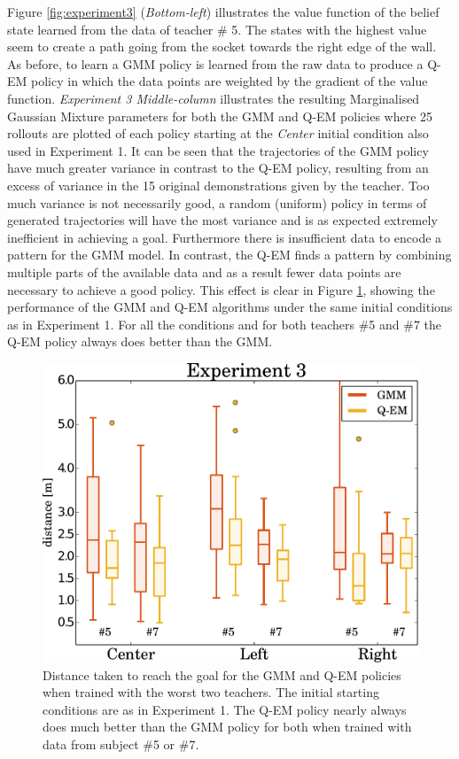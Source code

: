 \documentclass[final,5p,times,twocolumn]{elsarticle}
\begin{document}
Figure \ref{fig:experiment3} (\textit{Bottom-left}) illustrates the value function of the belief state learned from the data of teacher \# 5.
The states with the highest value seem to create a path going from the socket towards the right edge of the wall. 
As before, to learn a GMM policy is learned from the raw data to produce a Q-EM policy in which the data points are weighted by 
the gradient of the value function. \textit{Experiment 3 Middle-column} illustrates the 
resulting Marginalised Gaussian Mixture parameters for both the GMM and Q-EM policies where 25 rollouts are plotted of each policy starting at 
the \textit{Center} initial condition also used in Experiment 1. It can be seen that the trajectories of the GMM 
policy have much greater variance in contrast to the Q-EM policy, resulting from an excess of variance in the 15 original demonstrations
given by the teacher. Too much variance is not necessarily good, a random (uniform) policy in terms of generated trajectories
will have the most variance and is as expected extremely inefficient in achieving a goal. Furthermore there is insufficient data to encode a pattern for the GMM model. In contrast, the Q-EM finds a 
pattern by combining multiple parts of the available data and as a result fewer data points are necessary to achieve a good policy. 
This effect is clear in Figure \ref{fig:experiment3_stats}, showing the performance of the GMM and Q-EM algorithms 
under the same initial conditions as in Experiment 1. For all the conditions and for both teachers \#5 and \#7 the Q-EM policy 
always does better than the GMM.

\begin{figure}
 \centering
 \includegraphics[width=\linewidth]{./Figure/experiment3_stats.pdf}
 \caption{Distance taken to reach the goal for the GMM and Q-EM policies when trained with the 
 worst two teachers. The initial starting conditions are as in Experiment 1. 
 The Q-EM policy nearly always does much better than the GMM policy for both when trained with data 
 from subject \#5 or \#7.}
 \label{fig:experiment3_stats}
\end{figure}
\end{document}
